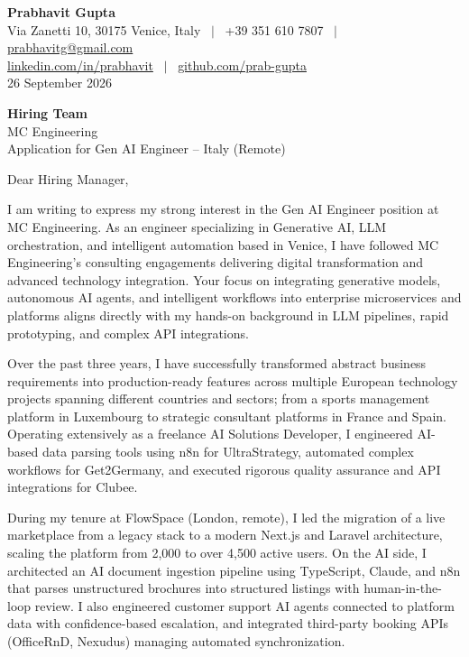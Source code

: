 \documentclass[11pt,a4paper]{article}
\begin{document}
\textbf{\large Prabhavit Gupta}\\
Via Zanetti 10, 30175 Venice, Italy ~$\vert$~ +39 351 610 7807 ~$\vert$~ \href{mailto:prabhavitg@gmail.com}{prabhavitg@gmail.com}\\
\href{https://www.linkedin.com/in/prabhavit/}{linkedin.com/in/prabhavit} ~$\vert$~ \href{https://github.com/prab-gupta}{github.com/prab-gupta}\\
26 September 2026

\textbf{Hiring Team}\\
MC Engineering\\
Application for Gen AI Engineer -- Italy (Remote)

Dear Hiring Manager,

I am writing to express my strong interest in the Gen AI Engineer position at MC Engineering. As an engineer specializing in Generative AI, LLM orchestration, and intelligent automation based in Venice, I have followed MC Engineering's consulting engagements delivering digital transformation and advanced technology integration. Your focus on integrating generative models, autonomous AI agents, and intelligent workflows into enterprise microservices and platforms aligns directly with my hands-on background in LLM pipelines, rapid prototyping, and complex API integrations.

Over the past three years, I have successfully transformed abstract business requirements into production-ready features across multiple European technology projects spanning different countries and sectors; from a sports management platform in Luxembourg to strategic consultant platforms in France and Spain. Operating extensively as a freelance AI Solutions Developer, I engineered AI-based data parsing tools using n8n for UltraStrategy, automated complex workflows for Get2Germany, and executed rigorous quality assurance and API integrations for Clubee.

During my tenure at FlowSpace (London, remote), I led the migration of a live marketplace from a legacy stack to a modern Next.js and Laravel architecture, scaling the platform from 2,000 to over 4,500 active users. On the AI side, I architected an AI document ingestion pipeline using TypeScript, Claude, and n8n that parses unstructured brochures into structured listings with human-in-the-loop review. I also engineered customer support AI agents connected to platform data with confidence-based escalation, and integrated third-party booking APIs (OfficeRnD, Nexudus) managing automated synchronization.
\end{document}
